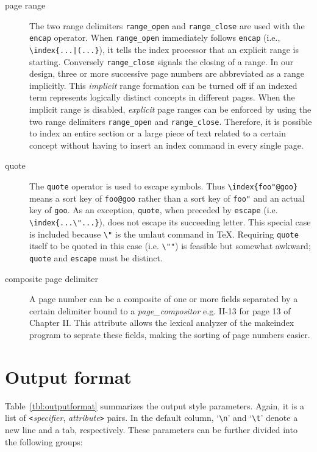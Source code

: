 \begin{description}

\item[page range] The two range delimiters \verb|range_open| and \verb|range_close| are
used with the \verb|encap| operator.
When \verb|range_open| immediately follows \verb|encap|
(i.e., \verb#\index{...|(...}#),
it tells the index processor that an explicit range is starting.
Conversely \verb|range_close| signals the closing of a range.
In our design, three or more successive page numbers are abbreviated as
a range implicitly.  This {\it implicit\/} range formation can be turned
off if an indexed term represents logically distinct concepts in different
pages.  When the implicit range is disabled, {\it explicit\/} page ranges
can be enforced by using the two range delimiters
\verb|range_open| and \verb|range_close|.
Therefore, it is possible to index an entire section or a large piece
of text related to a certain concept without having to insert an index
command in every single page.

\item [quote] The \verb|quote| operator is used to escape symbols.
Thus \verb|\index{foo"@goo}| means a sort key of \verb|foo@goo| 
rather than a sort key of \verb|foo"| and an actual key of \verb|goo|.
As an exception, \verb|quote|, when preceded by \verb|escape| (i.e.
\verb|\index{...\"...}|), does not escape its succeeding letter.
This special case is included because \verb|\"| is the umlaut
command in {\TeX}.  Requiring \verb|quote| itself to be quoted
in this case (i.e. \verb|\""|) is feasible but somewhat awkward;
\verb|quote| and \verb|escape| must be distinct.

\item[composite page delimiter] A page number can be a composite of one or more fields separated by a certain delimiter bound to a \textit{page\_compositor}  e.g. II-13 for page 13 of Chapter II. This attribute allows the lexical analyzer of the makeindex program to seprate these fields, making the sorting of page numbers easier.
\end{description}


\section{Output format}

Table~\ref{tbl:outputformat} summarizes the output style parameters.  Again, it is a list
of \verb|<|{\it specifier\/}, {\it attribute\/}\verb|>| pairs.
In the default column, `\verb|\n|' and `\verb|\t|' denote a new line
and a tab, respectively.  These parameters can be further divided into
the following groups:

